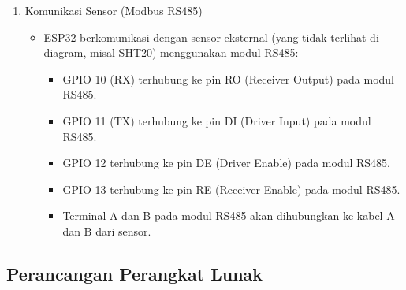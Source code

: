 \documentclass[a4paper, 12pt]{article}
\begin{document}
\begin{enumerate}
    \item Komunikasi Sensor (Modbus RS485)
    \begin{itemize}
        \item ESP32 berkomunikasi dengan sensor eksternal (yang tidak terlihat di diagram, misal SHT20) menggunakan modul RS485:
        \begin{itemize}
            \item GPIO 10 (RX) terhubung ke pin RO (Receiver Output) pada modul RS485.
            \item GPIO 11 (TX) terhubung ke pin DI (Driver Input) pada modul RS485.
            \item GPIO 12 terhubung ke pin DE (Driver Enable) pada modul RS485.
            \item GPIO 13 terhubung ke pin RE (Receiver Enable) pada modul RS485.
            \item Terminal A dan B pada modul RS485 akan dihubungkan ke kabel A dan B dari sensor.
        \end{itemize}
    \end{itemize}
\end{enumerate}

\subsection{Perancangan Perangkat Lunak}
\end{document}
